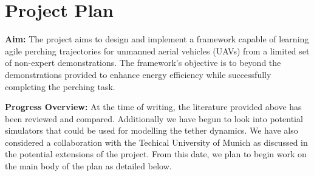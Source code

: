 \chapter{Project Plan}

\textbf{Aim: } The project aims to design and implement a framework capable of learning agile perching trajectories for unmanned aerial vehicles (UAVs) from a limited set of non-expert demonstrations. 
The framework's objective is to beyond the demonstrations provided to enhance energy efficiency while successfully completing the perching task.

\textbf{Progress Overview: } At the time of writing, the literature provided above has been reviewed and compared.
Additionally we have begun to look into potential simulators that could be used for modelling the tether dynamics.
We have also considered a collaboration with the Techical University of Munich as discussed in the potential extensions of the project.
From this date, we plan to begin work on the main body of the plan as detailed below.

